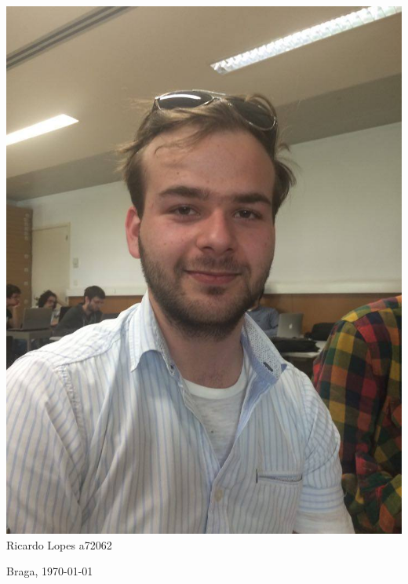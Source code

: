 \begin{titlepage}
\begin{center}
\begin{minipage}[b]{.1\textwidth}	\includegraphics[scale=0.1]{ricardo}
		\small{Ricardo Lopes a72062}
\end{minipage}



\vspace{3ex}


\vfill

\large Braga, {\large \today}

\end{center}
\end{titlepage}
